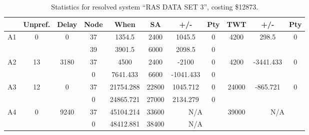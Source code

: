 \begin{sidewaystable}
\footnotesize
\caption{Statistics for resolved system ``RAS DATA SET 3'', costing \$12873.}
\centering
\begin{tabular}{c||c|c||c|c|c|c|c||c|c|c}
  \hline \hline
  &
  Unpref. & 
  Delay &
  Node &
  When &
  SA &
  +/- &
  Pty &
  TWT &
  +/- &
  Pty \\
      \hline
      \multirow{2}{*}{A1} &
      \multirow{2}{*}{0} &
      \multirow{2}{*}{0} &
      37 &
      1354.5 &
      2400 &
        1045.5 &
        0 &
      \multirow{2}{*}{4200} &
        \multirow{2}{*}{298.5} &
        \multirow{2}{*}{0}
      \\
      \cline{4-8}
       &
       &
       &
      39 &
      3901.5 &
      6000 &
        2098.5 &
        0 &
      
         &
        
      \\
      \hline
      \multirow{2}{*}{A2} &
      \multirow{2}{*}{13} &
      \multirow{2}{*}{3180} &
      37 &
      4500 &
      2400 &
        -2100 &
        0 &
      \multirow{2}{*}{4200} &
        \multirow{2}{*}{-3441.433} &
        \multirow{2}{*}{0}
      \\
      \cline{4-8}
       &
       &
       &
      0 &
      7641.433 &
      6600 &
        -1041.433 &
        0 &
      
         &
        
      \\
      \hline
      \multirow{2}{*}{A3} &
      \multirow{2}{*}{12} &
      \multirow{2}{*}{0} &
      37 &
      21754.288 &
      22800 &
        1045.712 &
        0 &
      \multirow{2}{*}{24000} &
        \multirow{2}{*}{-865.721} &
        \multirow{2}{*}{0}
      \\
      \cline{4-8}
       &
       &
       &
      0 &
      24865.721 &
      27000 &
        2134.279 &
        0 &
      
         &
        
      \\
      \hline
      \multirow{2}{*}{A4} &
      \multirow{2}{*}{0} &
      \multirow{2}{*}{9240} &
      37 &
      45104.214 &
      33600 &
        \multicolumn{2}{|c||}{N/A} &
      \multirow{2}{*}{39000} &
        \multicolumn{2}{c}{\multirow{2}{*}{N/A}}
      \\
      \cline{4-8}
       &
       &
       &
      0 &
      48412.881 &
      38400 &
        \multicolumn{2}{|c||}{N/A} &
      

\end{tabular}
\end{sidewaystable}

